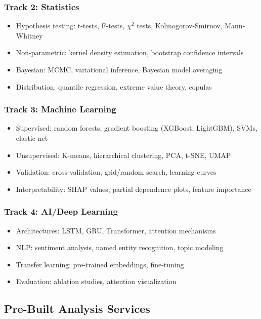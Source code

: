 \subsubsection{Track 2: Statistics}

\begin{itemize}
  \item Hypothesis testing: t-tests, F-tests, $\chi^2$ tests, Kolmogorov-Smirnov, Mann-Whitney
  \item Non-parametric: kernel density estimation, bootstrap confidence intervals
  \item Bayesian: MCMC, variational inference, Bayesian model averaging
  \item Distribution: quantile regression, extreme value theory, copulas
\end{itemize}

\subsubsection{Track 3: Machine Learning}

\begin{itemize}
  \item Supervised: random forests, gradient boosting (XGBoost, LightGBM), SVMs, elastic net
  \item Unsupervised: K-means, hierarchical clustering, PCA, t-SNE, UMAP
  \item Validation: cross-validation, grid/random search, learning curves
  \item Interpretability: SHAP values, partial dependence plots, feature importance
\end{itemize}

\subsubsection{Track 4: AI/Deep Learning}

\begin{itemize}
  \item Architectures: LSTM, GRU, Transformer, attention mechanisms
  \item NLP: sentiment analysis, named entity recognition, topic modeling
  \item Transfer learning: pre-trained embeddings, fine-tuning
  \item Evaluation: ablation studies, attention visualization
\end{itemize}

\subsection{Pre-Built Analysis Services}

